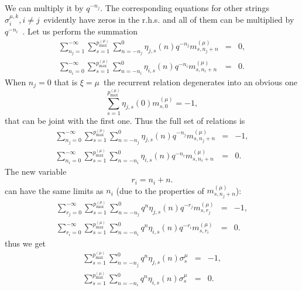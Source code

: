 \documentclass{article}
\begin{document}
We can multiply it by $q^{-n_{j}}$. The corresponding equations for other
strings $\sigma _{i}^{\mu ,k},i\neq j$\ evidently have zeros in the r.h.s.
and all of them can be multiplied by $q^{-n_{i}}$\ . Let us perform the
summation
\begin{eqnarray*}
\sum_{n_{j}=1}^{-\infty }\sum_{s=1}^{p_{\max }^{\left( \mu \right)
}}\sum_{n=-n_{j}}^{0}\eta _{j,s}\left( n\right)
q^{-n_{j}}m_{s,n_{j}+n}^{\left( \mu \right) } &=&0, \\
\sum_{n_{i}=0}^{-\infty }\sum_{s=1}^{p_{\max }^{\left( \mu \right)
}}\sum_{n=-n_{i}}^{0}\eta _{i,s}\left( n\right)
q^{-n_{i}}m_{s,n_{i}+n}^{\left( \mu \right) } &=&0.
\end{eqnarray*}
When $n_{j}=0$ that is $\xi =\mu $\ the recurrent relation degenerates into
an obvious one
\begin{equation*}
\sum_{s=1}^{p_{\max }^{\left( \mu \right) }}\eta _{j,s}\left( 0\right)
m_{s,0}^{\left( \mu \right) }=-1,
\end{equation*}
that can be joint with the first one. Thus the full set of relations is
\begin{eqnarray*}
\sum_{n_{j}=0}^{-\infty }\sum_{s=1}^{p_{\max }^{\left( \mu \right)
}}\sum_{n=-n_{j}}^{0}\eta _{j,s}\left( n\right)
q^{-n_{j}}m_{s,n_{j}+n}^{\left( \mu \right) } &=&-1, \\
\sum_{n_{i}=0}^{-\infty }\sum_{s=1}^{p_{\max }^{\left( \mu \right)
}}\sum_{n=-n_{i}}^{0}\eta _{i,s}\left( n\right)
q^{-n_{i}}m_{s,n_{i}+n}^{\left( \mu \right) } &=&0.
\end{eqnarray*}
The new variable
\begin{equation*}
r_{i}=n_{i}+n.
\end{equation*}
can have the same limits as $n_{i}$ (due to the properties of $%
m_{s,n_{j}+n}^{\left( \mu \right) }$):
\begin{eqnarray*}
\sum_{r_{j}=0}^{-\infty }\sum_{s=1}^{p_{\max }^{\left( \mu \right)
}}\sum_{n=-n_{j}}^{0}q^{n}\eta _{j,s}\left( n\right)
q^{-r_{j}}m_{s,r_{j}}^{\left( \mu \right) } &=&-1, \\
\sum_{r_{i}=0}^{-\infty }\sum_{s=1}^{p_{\max }^{\left( \mu \right)
}}\sum_{n=-n_{i}}^{0}q^{n}\eta _{i,s}\left( n\right)
q^{-r_{i}}m_{s,r_{i}}^{\left( \mu \right) } &=&0.
\end{eqnarray*}
thus we get
\begin{eqnarray*}
\sum_{s=1}^{p_{\max }^{\left( \mu \right) }}\sum_{n=-n_{j}}^{0}q^{n}\eta
_{j,s}\left( n\right) \sigma _{s}^{\mu } &=&-1, \\
\sum_{s=1}^{p_{\max }^{\left( \mu \right) }}\sum_{n=-n_{i}}^{0}q^{n}\eta
_{i,s}\left( n\right) \sigma _{s}^{\mu } &=&0.
\end{eqnarray*}
\end{document}
